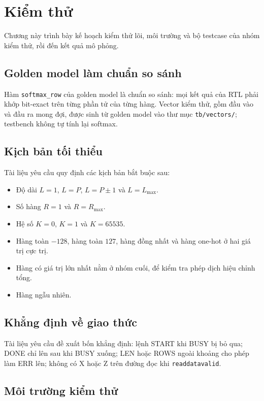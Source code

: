 \section{Kiểm thử}

Chương này trình bày kế hoạch kiểm thử lõi, môi trường và bộ testcase của nhóm kiểm thử, rồi đến kết quả mô phỏng.

\subsection{Golden model làm chuẩn so sánh}

Hàm \texttt{softmax\_row} của golden model là chuẩn so sánh: mọi kết quả của RTL phải khớp bit-exact trên từng phần tử của từng hàng. Vector kiểm thử, gồm đầu vào và đầu ra mong đợi, được sinh từ golden model vào thư mục \texttt{tb/vectors/}; testbench không tự tính lại softmax.

\subsection{Kịch bản tối thiểu}

Tài liệu yêu cầu quy định các kịch bản bắt buộc sau:
\begin{itemize}
  \item Độ dài $L = 1$, $L = P$, $L = P \pm 1$ và $L = L_{\max}$.
  \item Số hàng $R = 1$ và $R = R_{\max}$.
  \item Hệ số $K = 0$, $K = 1$ và $K = 65535$.
  \item Hàng toàn $-128$, hàng toàn $127$, hàng đồng nhất và hàng one-hot ở hai giá trị cực trị.
  \item Hàng có giá trị lớn nhất nằm ở nhóm cuối, để kiểm tra phép dịch hiệu chỉnh tổng.
  \item Hàng ngẫu nhiên.
\end{itemize}

\subsection{Khẳng định về giao thức}

Tài liệu yêu cầu đề xuất bốn khẳng định: lệnh START khi BUSY bị bỏ qua; DONE chỉ lên sau khi BUSY xuống; LEN hoặc ROWS ngoài khoảng cho phép làm ERR lên; không có X hoặc Z trên đường đọc khi \texttt{readdatavalid}.

\subsection{Môi trường kiểm thử}

